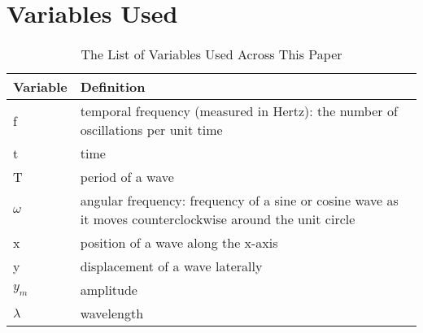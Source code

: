 \chapter{Variables Used}\label{appendix:global-variables}
\begin{table}
	\begin{tabular}{|p{20em} | p{25em}|}
		\hline
		Variable & Definition \\
		\hline
		f & temporal frequency (measured in Hertz): the number of oscillations per unit time \\
		t & time \\
		T & period of a wave \\
		$\omega$ & angular frequency: frequency of a sine or cosine wave as it moves counterclockwise around the unit circle \\
		x & position of a wave along the x-axis \\
		y & displacement of a wave laterally \\
		$y_m$ & amplitude \\
		$\lambda$ & wavelength \\
		\hline
	\end{tabular}
\caption{The List of Variables Used Across This Paper}
\label{tbl:global-variables}
\end{table}